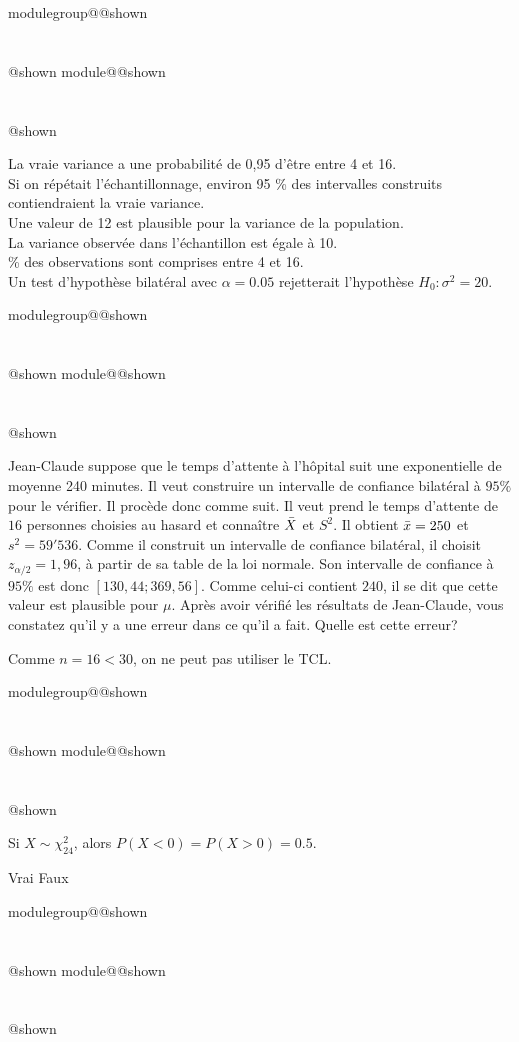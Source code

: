 \documentclass{Evaluation}
\makeatletter
\newcommand{\currentmodulekey}{}
\newcommand{\currentmoduletitle}{}
\newcommand{\currentgroupkey}{}
\newcommand{\currentgrouptitle}{}
\newcommand{\showmoduleifneeded}{%
  \ifx\currentgroupkey\empty\else
    \expandafter\ifx\csname modulegroup@\currentgroupkey @shown\endcsname\relax
      \section*{\currentgrouptitle}%
      \expandafter\gdef\csname modulegroup@\currentgroupkey @shown\endcsname{1}%
    \fi
  \fi
  \expandafter\ifx\csname module@\currentmodulekey @shown\endcsname\relax
    \section*{\currentmoduletitle}%
    \expandafter\gdef\csname module@\currentmodulekey @shown\endcsname{1}%
  \fi
}
\newenvironment{A22}{\showmoduleifneeded}{}
\newenvironment{H26}{\showmoduleifneeded}{}
\makeatother
\begin{document}
\begin{questions}
\begin{H26}
\begin{oneparcheckboxes}
\choice La vraie variance a une probabilité de 0,95 d’être entre 4 et 16.\\[4pt]
\correctchoice Si on répétait l’échantillonnage, environ 95 \% des intervalles construits contiendraient la vraie variance.\\[4pt]
\correctchoice Une valeur de 12 est plausible pour la variance de la population.\\[4pt]
\choice La variance observée dans l'échantillon est égale à 10.\\[4pt]
 \% des observations sont comprises entre 4 et 16.\\[4pt]
\correctchoice Un test d'hypothèse bilatéral avec $\alpha = 0.05$ rejetterait l'hypothèse $H_0 : \sigma^2 = 20$.
\end{oneparcheckboxes}
\end{H26}

\begin{A22}
\question {} %
Jean-Claude suppose que le temps d'attente à l'hôpital suit une exponentielle de moyenne 240 minutes. 
Il veut construire un intervalle de confiance bilatéral à $95\%$ pour le vérifier.
Il procède donc comme suit. 
Il veut prend le temps d'attente de $16$ personnes choisies au hasard et connaître $\Bar{X}$ et $S^2$. 
Il obtient $\Bar{x}=250$ et $s^2=59'536$.
Comme il construit un intervalle de confiance bilatéral, il choisit $z_{\alpha/2}=1,96$, à partir de sa table de la loi normale.
Son intervalle de confiance à $95\%$ est donc $[130,44;369,56]$.
Comme celui-ci contient $240$, il se dit que cette valeur est plausible pour $\mu$. 
Après avoir vérifié les résultats de Jean-Claude, vous constatez qu'il y a une erreur dans ce qu'il a fait. 
Quelle est cette erreur?

\begin{solution}
   Comme $n=16<30$, on ne peut pas utiliser le TCL.
\end{solution}
\end{A22}

\begin{A22}
\question {} %
Si $X \sim \chi^2_{24}$, alors $P(X<0)=P(X>0)=0.5$.

\begin{oneparcheckboxes}
\choice Vrai
\choice Faux
\end{oneparcheckboxes}
\end{A22}

\begin{A22}
\question {} %


\end{A22}
\end{questions}
\end{document}
